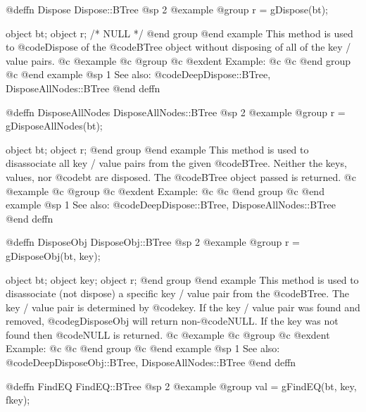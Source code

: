 @deffn {Dispose} Dispose::BTree
@sp 2
@example
@group
r = gDispose(bt);

object  bt;
object  r;     /*  NULL  */
@end group
@end example
This method is used to @code{Dispose} of the @code{BTree} object without
disposing of all of the key / value pairs.
@c @example
@c @group
@c @exdent Example:
@c 
@c @end group
@c @end example
@sp 1
See also:  @code{DeepDispose::BTree, DisposeAllNodes::BTree}
@end deffn









@deffn {DisposeAllNodes} DisposeAllNodes::BTree
@sp 2
@example
@group
r = gDisposeAllNodes(bt);

object  bt;
object  r;
@end group
@end example
This method is used to disassociate all key / value pairs from the given
@code{BTree}.  Neither the keys, values, nor @code{bt} are disposed.  The
@code{BTree} object passed is returned.
@c @example
@c @group
@c @exdent Example:
@c 
@c @end group
@c @end example
@sp 1
See also:  @code{DeepDispose::BTree, DisposeAllNodes::BTree}
@end deffn












@deffn {DisposeObj} DisposeObj::BTree
@sp 2
@example
@group
r = gDisposeObj(bt, key);

object  bt;
object  key;
object  r;
@end group
@end example
This method is used to disassociate (not dispose) a specific key / value
pair from the @code{BTree}.  The key / value pair is determined by
@code{key}.  If the key / value pair was found and removed,
@code{gDisposeObj} will return non-@code{NULL}.  If the key was not
found then @code{NULL} is returned.
@c @example
@c @group
@c @exdent Example:
@c 
@c @end group
@c @end example
@sp 1
See also:  @code{DeepDisposeObj::BTree, DisposeAllNodes::BTree}
@end deffn



















@deffn {FindEQ} FindEQ::BTree
@sp 2
@example
@group
val = gFindEQ(bt, key, fkey);

